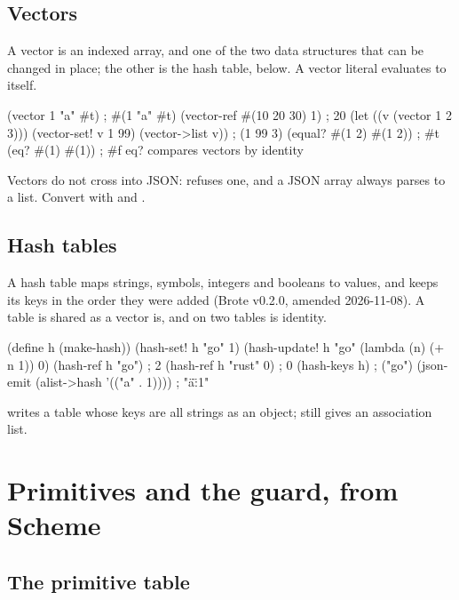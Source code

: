 \section{Vectors}

A vector is an indexed array, and one of the two data structures that can
be changed in place; the other is the hash table, below. A vector literal
evaluates to itself.

\begin{scm}
(vector 1 "a" #t)                 ; #(1 "a" #t)
(vector-ref #(10 20 30) 1)        ; 20
(let ((v (vector 1 2 3)))
  (vector-set! v 1 99)
  (vector->list v))               ; (1 99 3)
(equal? #(1 2) #(1 2))            ; #t
(eq? #(1) #(1))                   ; #f   eq? compares vectors by identity
\end{scm}

Vectors do not cross into JSON:  refuses one, and a JSON
array always parses to a list. Convert with  and
.

\section{Hash tables}

A hash table maps strings, symbols, integers and booleans to values, and
keeps its keys in the order they were added (Brote v0.2.0, 
amended 2026-11-08). A table is shared as a vector is, and 
on two tables is identity.

\begin{scm}
(define h (make-hash))
(hash-set! h "go" 1)
(hash-update! h "go" (lambda (n) (+ n 1)) 0)
(hash-ref h "go")                 ; 2
(hash-ref h "rust" 0)             ; 0
(hash-keys h)                     ; ("go")
(json-emit (alist->hash '(("a" . 1))))   ; "{\"a\":1}"
\end{scm}

 writes a table whose keys are all strings as an object;
 still gives an association list.

\chapter{Primitives and the guard, from Scheme}

\section{The primitive table}

